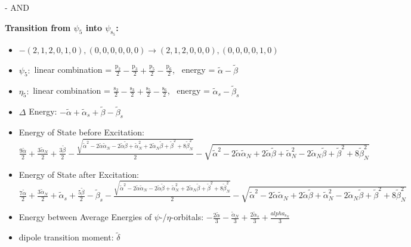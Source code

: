 \documentclass[12pt,a4paper]{article}
\begin{document}
 -  AND 

        \noindent\textbf{Transition from $\psi_{5}$ into $\psi_{\text{s}_{5}}$:}
        \begin{itemize}
            \item $- (2, 1, 2, 0, 1, 0), (0, 0, 0, 0, 0, 0) \rightarrow (2, 1, 2, 0, 0, 0), (0, 0, 0, 0, 1, 0)$
        
            \item $\psi_{5}:$ linear combination = $\frac{\text{p}_{2}}{2} - \frac{\text{p}_{3}}{2} + \frac{\text{p}_{5}}{2} - \frac{\text{p}_{6}}{2}$, \
            energy = $\tilde{\alpha} - \tilde{\beta}$
            
            \item $\eta_{5}:$ linear combination = $\frac{\text{s}_{2}}{2} - \frac{\text{s}_{3}}{2} + \frac{\text{s}_{5}}{2} - \frac{\text{s}_{6}}{2}$, \
            energy = $\tilde{\alpha}_{s} - \tilde{\beta}_{s}$
            
                \item $\Delta$ Energy: $- \tilde{\alpha} + \tilde{\alpha}_{s} + \tilde{\beta} - \tilde{\beta}_{s}$
                \item Energy of State before Excitation: $\frac{9 \tilde{\alpha}}{2} + \frac{3 \tilde{\alpha}_{N}}{2} + \frac{3 \tilde{\beta}}{2} - \frac{\sqrt{\tilde{\alpha}^{2} - 2 \tilde{\alpha} \tilde{\alpha}_{N} - 2 \tilde{\alpha} \tilde{\beta} + \tilde{\alpha}_{N}^{2} + 2 \tilde{\alpha}_{N} \tilde{\beta} + \tilde{\beta}^{2} + 8 \tilde{\beta}_{N}^{2}}}{2} - \sqrt{\tilde{\alpha}^{2} - 2 \tilde{\alpha} \tilde{\alpha}_{N} + 2 \tilde{\alpha} \tilde{\beta} + \tilde{\alpha}_{N}^{2} - 2 \tilde{\alpha}_{N} \tilde{\beta} + \tilde{\beta}^{2} + 8 \tilde{\beta}_{N}^{2}}$
                \item Energy of State after Excitation: $\frac{7 \tilde{\alpha}}{2} + \frac{3 \tilde{\alpha}_{N}}{2} + \tilde{\alpha}_{s} + \frac{5 \tilde{\beta}}{2} - \tilde{\beta}_{s} - \frac{\sqrt{\tilde{\alpha}^{2} - 2 \tilde{\alpha} \tilde{\alpha}_{N} - 2 \tilde{\alpha} \tilde{\beta} + \tilde{\alpha}_{N}^{2} + 2 \tilde{\alpha}_{N} \tilde{\beta} + \tilde{\beta}^{2} + 8 \tilde{\beta}_{N}^{2}}}{2} - \sqrt{\tilde{\alpha}^{2} - 2 \tilde{\alpha} \tilde{\alpha}_{N} + 2 \tilde{\alpha} \tilde{\beta} + \tilde{\alpha}_{N}^{2} - 2 \tilde{\alpha}_{N} \tilde{\beta} + \tilde{\beta}^{2} + 8 \tilde{\beta}_{N}^{2}}$
                \item Energy between Average Energies of $\psi$-/$\eta$-orbitals: $- \frac{2 \tilde{\alpha}}{3} - \frac{\tilde{\alpha}_{N}}{3} + \frac{2 \tilde{\alpha}_{s}}{3} + \frac{alpha_{\text{s}_N}}{3}$
            
            \item dipole transition moment: $\tilde{\delta}$
        
        \end{itemize}
        
\end{document}

